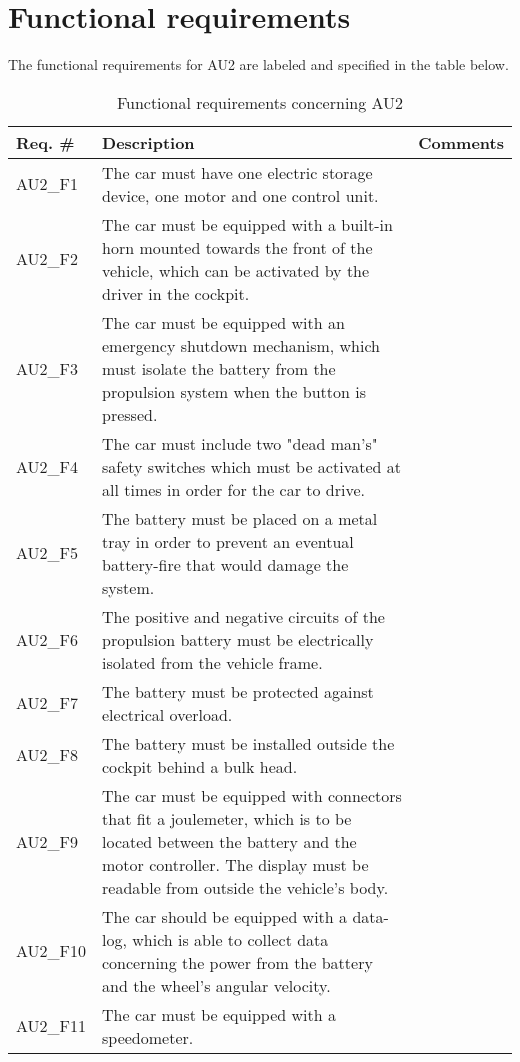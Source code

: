 \section{Functional requirements}
The functional requirements for AU2 are labeled and specified in the table below.

\begin{table}[h!]
	\label{FREQ_AU2}
	\centering
	\begin{tabular}{|p{2 cm}|p{7 cm}|p{4 cm}|}
		\hline
		\textbf{Req. \#} & \textbf{Description} & \textbf{Comments} \\\hline
		AU2\_F1		& The car must have one electric storage device, one motor and one control unit. &   \\\hline
		AU2\_F2		& The car must be equipped with a built-in horn mounted towards the front of the vehicle, which can be activated by the driver in the cockpit. &   \\\hline
		AU2\_F3		& The car must be equipped with an emergency shutdown mechanism, which must isolate the battery from the propulsion system when the button is pressed. &   \\\hline
		AU2\_F4		& The car must include two "dead man's" safety switches which must be activated at all times in order for the car to drive. &   \\\hline
		AU2\_F5		& The battery must be placed on a metal tray in order to prevent an eventual battery-fire that would damage the system. &   \\\hline
		AU2\_F6	& The positive and negative circuits of the propulsion battery  must be electrically isolated from the vehicle frame. &   \\\hline
		AU2\_F7	& 
		The battery must be protected against electrical overload. &   \\\hline
		AU2\_F8		& The battery must be installed outside the cockpit behind a bulk head. &   \\\hline
		AU2\_F9	\fxnote{Joulemeter - Laimonas}	& The car must be equipped with connectors that fit a joulemeter, which is to be located between the battery and the motor controller. The display must be readable from outside the vehicle's body. &   \\\hline
		AU2\_F10	& The car should be equipped with a data-log, which is able to collect data concerning the power from the battery and the wheel's angular velocity. &   \\\hline
		AU2\_F11	& The car must be equipped with a speedometer. &   \\\hline
	\end{tabular}
	\caption{Functional requirements concerning AU2}
\end{table}